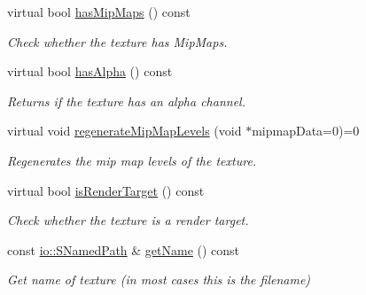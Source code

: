\begin{DoxyCompactItemize}
virtual bool \hyperlink{classirr_1_1video_1_1ITexture_a9da815ed3b2a3efec45f957c6918fbba}{has\+Mip\+Maps} () const
\begin{DoxyCompactList}\small\item\em Check whether the texture has Mip\+Maps. \end{DoxyCompactList}\item 
\mbox{\label{classirr_1_1video_1_1ITexture_a5ccc3cc2463f2ac78902eccba63271d3}} 
virtual bool \hyperlink{classirr_1_1video_1_1ITexture_a5ccc3cc2463f2ac78902eccba63271d3}{has\+Alpha} () const
\begin{DoxyCompactList}\small\item\em Returns if the texture has an alpha channel. \end{DoxyCompactList}\item 
virtual void \hyperlink{classirr_1_1video_1_1ITexture_a9517c37f071479d0698cdf597f8fea45}{regenerate\+Mip\+Map\+Levels} (void $\ast$mipmap\+Data=0)=0
\begin{DoxyCompactList}\small\item\em Regenerates the mip map levels of the texture. \end{DoxyCompactList}\item 
virtual bool \hyperlink{classirr_1_1video_1_1ITexture_aac5c0e281e1aa49365fdb7e7fa4d7342}{is\+Render\+Target} () const
\begin{DoxyCompactList}\small\item\em Check whether the texture is a render target. \end{DoxyCompactList}\item 
\mbox{\label{classirr_1_1video_1_1ITexture_ace31573b2a624446f15fe56d1e609810}} 
const \hyperlink{structirr_1_1io_1_1SNamedPath}{io\+::\+S\+Named\+Path} \& \hyperlink{classirr_1_1video_1_1ITexture_ace31573b2a624446f15fe56d1e609810}{get\+Name} () const
\begin{DoxyCompactList}\small\item\em Get name of texture (in most cases this is the filename) \end{DoxyCompactList}\end{DoxyCompactItemize}
